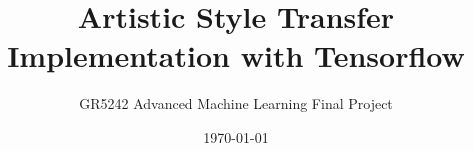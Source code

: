 \documentclass[letterpaper,11pt, oneside]{layout}
\title{Artistic Style Transfer Implementation with Tensorflow}
\subtitle{GR5242 Advanced Machine Learning Final Project}
\date{\today}
\begin{document}
\cleardoublepage
\maketitle

\frontmatter

%

\tableofcontents
\listoffigures
\listoftables


\mainmatter








\appendix
\renewcommand\theequation{\Alph{chapter}--\arabic{equation}}
\renewcommand\thefigure{\Alph{chapter}--\arabic{figure}}
\renewcommand\thetable{\Alph{chapter}--\arabic{table}}





\backmatter



\end{document}
